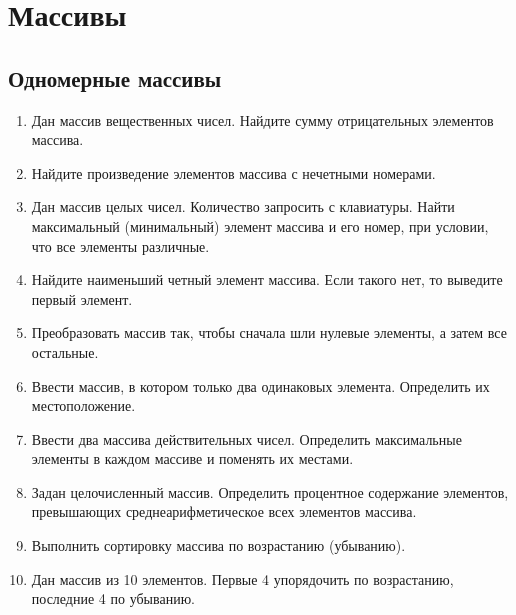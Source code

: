 \chapter{Массивы}

\section{Одномерные массивы}
\begin{enumerate}[leftmargin=*]
    \item Дан массив вещественных чисел. Найдите сумму отрицательных элементов массива.
    \item Найдите произведение элементов массива с нечетными номерами.
    \item Дан массив целых чисел. Количество запросить с клавиатуры. Найти максимальный (минимальный) элемент массива и его номер, при условии, что все элементы различные.
    \item Найдите наименьший четный элемент массива. Если такого нет, то выведите первый элемент.
    \item Преобразовать массив так, чтобы сначала шли нулевые элементы, а затем все остальные.
    \item Ввести массив, в котором только два одинаковых элемента. Определить их местоположение.
    \item Ввести два массива действительных чисел. Определить максимальные элементы в каждом массиве и поменять их местами.
    \item Задан целочисленный массив. Определить процентное содержание элементов, превышающих среднеарифметическое всех элементов массива.
    \item Выполнить сортировку массива по возрастанию (убыванию).
    \item Дан массив из 10 элементов. Первые 4 упорядочить по возрастанию, последние 4 по убыванию.
\end{enumerate}
